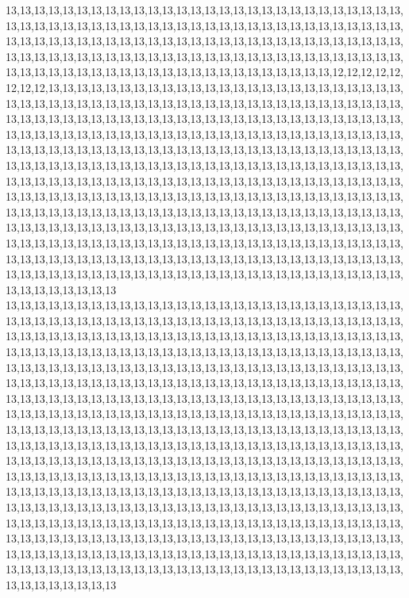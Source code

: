 13,13,13,13,13,13,13,13,13,13,13,13,13,13,13,13,13,13,13,13,13,13,13,13,13,13,13,13,13,13,13,13,13,13,13,13,13,13,13,13,13,13,13,13,13,13,13,13,13,13,13,13,13,13,13,13,13,13,13,13,13,13,13,13,13,13,13,13,13,13,13,13,13,13,13,13,13,13,13,13,13,13,13,13,13,13,13,13,13,13,13,13,13,13,13,13,13,13,13,13,13,13,13,13,13,13,13,13,13,13,13,13,13,13,13,13,13,13,13,13,13,13,13,13,13,13,13,13,13,13,13,13,13,13,13,12,12,12,12,12,12,12,12,13,13,13,13,13,13,13,13,13,13,13,13,13,13,13,13,13,13,13,13,13,13,13,13,13,13,13,13,13,13,13,13,13,13,13,13,13,13,13,13,13,13,13,13,13,13,13,13,13,13,13,13,13,13,13,13,13,13,13,13,13,13,13,13,13,13,13,13,13,13,13,13,13,13,13,13,13,13,13,13,13,13,13,13,13,13,13,13,13,13,13,13,13,13,13,13,13,13,13,13,13,13,13,13,13,13,13,13,13,13,13,13,13,13,13,13,13,13,13,13,13,13,13,13,13,13,13,13,13,13,13,13,13,13,13,13,13,13,13,13,13,13,13,13,13,13,13,13,13,13,13,13,13,13,13,13,13,13,13,13,13,13,13,13,13,13,13,13,13,13,13,13,13,13,13,13,13,13,13,13,13,13,13,13,13,13,13,13,13,13,13,13,13,13,13,13,13,13,13,13,13,13,13,13,13,13,13,13,13,13,13,13,13,13,13,13,13,13,13,13,13,13,13,13,13,13,13,13,13,13,13,13,13,13,13,13,13,13,13,13,13,13,13,13,13,13,13,13,13,13,13,13,13,13,13,13,13,13,13,13,13,13,13,13,13,13,13,13,13,13,13,13,13,13,13,13,13,13,13,13,13,13,13,13,13,13,13,13,13,13,13,13,13,13,13,13,13,13,13,13,13,13,13,13,13,13,13,13,13,13,13,13,13,13,13,13,13,13,13,13,13,13,13,13,13,13,13,13,13,13,13,13,13,13,13,13,13,13,13,13,13,13,13,13,13,13,13,13,13,13,13,13,13,13,13,13,13,13,13,13,13,13,13,13,13,13,13,13,13
13,13,13,13,13,13,13,13,13,13,13,13,13,13,13,13,13,13,13,13,13,13,13,13,13,13,13,13,13,13,13,13,13,13,13,13,13,13,13,13,13,13,13,13,13,13,13,13,13,13,13,13,13,13,13,13,13,13,13,13,13,13,13,13,13,13,13,13,13,13,13,13,13,13,13,13,13,13,13,13,13,13,13,13,13,13,13,13,13,13,13,13,13,13,13,13,13,13,13,13,13,13,13,13,13,13,13,13,13,13,13,13,13,13,13,13,13,13,13,13,13,13,13,13,13,13,13,13,13,13,13,13,13,13,13,13,13,13,13,13,13,13,13,13,13,13,13,13,13,13,13,13,13,13,13,13,13,13,13,13,13,13,13,13,13,13,13,13,13,13,13,13,13,13,13,13,13,13,13,13,13,13,13,13,13,13,13,13,13,13,13,13,13,13,13,13,13,13,13,13,13,13,13,13,13,13,13,13,13,13,13,13,13,13,13,13,13,13,13,13,13,13,13,13,13,13,13,13,13,13,13,13,13,13,13,13,13,13,13,13,13,13,13,13,13,13,13,13,13,13,13,13,13,13,13,13,13,13,13,13,13,13,13,13,13,13,13,13,13,13,13,13,13,13,13,13,13,13,13,13,13,13,13,13,13,13,13,13,13,13,13,13,13,13,13,13,13,13,13,13,13,13,13,13,13,13,13,13,13,13,13,13,13,13,13,13,13,13,13,13,13,13,13,13,13,13,13,13,13,13,13,13,13,13,13,13,13,13,13,13,13,13,13,13,13,13,13,13,13,13,13,13,13,13,13,13,13,13,13,13,13,13,13,13,13,13,13,13,13,13,13,13,13,13,13,13,13,13,13,13,13,13,13,13,13,13,13,13,13,13,13,13,13,13,13,13,13,13,13,13,13,13,13,13,13,13,13,13,13,13,13,13,13,13,13,13,13,13,13,13,13,13,13,13,13,13,13,13,13,13,13,13,13,13,13,13,13,13,13,13,13,13,13,13,13,13,13,13,13,13,13,13,13,13,13,13,13,13,13,13,13,13,13,13,13,13,13,13,13,13,13,13,13,13,13,13,13,13,13,13,13,13,13,13,13,13,13,13,13,13,13,13,13,13,13,13,13,13,13,13,13,13,13,13,13,13,13,13,13,13,13,13
